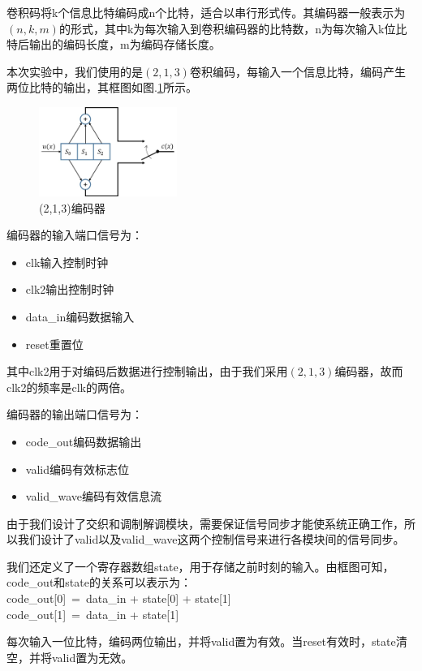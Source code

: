 卷积码将k个信息比特编码成n个比特，适合以串行形式传。其编码器一般表示为$(n,k,m)$的形式，其中k为每次输入到卷积编码器的比特数，n为每次输入k位比特后输出的编码长度，m为编码存储长度。

本次实验中，我们使用的是$(2,1,3)$卷积编码，每输入一个信息比特，编码产生两位比特的输出，其框图如图.\ref{fig:encoder}所示。

\begin{figure}[htb]
\centering
\includegraphics[width=0.4\textwidth]{images//encoder.jpg}
\caption{\label{fig:encoder}(2,1,3)编码器}
\end{figure}

编码器的输入端口信号为：
\begin{itemize}
\item clk\quad        输入控制时钟
\item clk2\quad       输出控制时钟
\item data\_in\quad    编码数据输入
\item reset\quad    重置位
\end{itemize}
其中clk2用于对编码后数据进行控制输出，由于我们采用$(2,1,3)$编码器，故而clk2的频率是clk的两倍。

编码器的输出端口信号为：
\begin{itemize}
\item code\_out\quad        编码数据输出
\item valid\quad       编码有效标志位
\item valid\_wave\quad    编码有效信息流
\end{itemize}
由于我们设计了交织和调制解调模块，需要保证信号同步才能使系统正确工作，所以我们设计了valid以及valid\_wave这两个控制信号来进行各模块间的信号同步。

我们还定义了一个寄存器数组state，用于存储之前时刻的输入。由框图可知，code\_out和state的关系可以表示为：\\
\quad\quad\quad code\_out[0]~=~data\_in + state[0] + state[1]\\
\quad\quad\quad code\_out[1]~=~data\_in + state[1]

每次输入一位比特，编码两位输出，并将valid置为有效。当reset有效时，state清空，并将valid置为无效。

